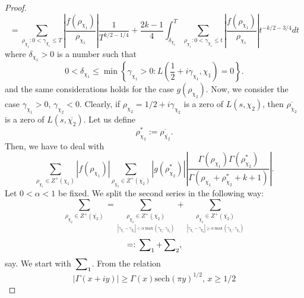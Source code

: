 \documentclass[10pt,a4paper]{amsart}
\numberwithin{equation}{section}
\numberwithin{figure}{section}
\begin{document}
\begin{proof}
\[\]
\begin{equation}
=\sum_{\rho_{\chi_{1}}:0<\gamma_{\chi_{1}}\leq T}\left|\frac{f\left(\rho_{\chi_{1}}\right)}{\rho_{\chi_{1}}}\right|\frac{1}{T^{k/2-1/4}}+\frac{2k-1}{4}\int_{\delta_{\chi_{1}}}^{T}\sum_{\rho_{\chi_{1}}:0<\gamma_{\chi_{1}}\leq t}\left|\frac{f\left(\rho_{\chi_{1}}\right)}{\rho_{\chi_{1}}}\right|t^{-k/2-3/4}dt\label{eq:PS double series}
\end{equation}
where $\delta_{\chi_{1}}>0$ is a number such that
\[
0<\delta_{\chi_{1}}\leq\min\left\{ \gamma_{\chi_{1}}>0:L\left(\frac{1}{2}+i\gamma_{\chi_{1}},\chi_{1}\right)=0\right\} .
\]
and the same considerations holds for the case $g\left(\rho_{\chi_{2}}\right)$.
Now, we consider the case $\gamma_{\chi_{1}}>0,\,\gamma_{\chi_{2}}<0.$
Clearly, if $\rho_{\chi_{2}}=1/2+i\gamma_{\chi_{2}}$ is a zero of
$L\left(s,\chi_{2}\right)$, then $\overline{\rho_{\chi_{2}}}$ is
a zero of $L\left(s,\overline{\chi_{2}}\right)$. Let us define
\[
\rho_{\chi_{2}}^{*}:=\overline{\rho_{\overline{\chi_{2}}}}.
\]
Then, we have to deal with
\[
\sum_{\rho_{\chi_{1}}\in Z^{+}\left(\chi_{1}\right)}\left|f\left(\rho_{\chi_{1}}\right)\right|\sum_{\rho_{\overline{\chi_{2}}}\in Z^{+}\left(\overline{\chi_{2}}\right)}\left|g\left(\rho_{\chi_{2}}^{*}\right)\right|\left|\frac{\Gamma\left(\rho_{\chi_{1}}\right)\Gamma\left(\rho_{\chi_{2}}^{*}\right)}{\Gamma\left(\rho_{\chi_{1}}+\rho_{\chi_{2}}^{*}+k+1\right)}\right|.
\]
Let $0<\alpha<1$ be fixed. We split the second series in the following
way:
\[
\sum_{\rho_{\chi_{2}}\in Z^{+}\left(\overline{\chi_{2}}\right)}=\sum_{\underset{{\scriptstyle \left|\gamma_{\chi_{1}}-\gamma_{\chi_{2}}\right|<\alpha\max\left(\gamma_{\chi_{1}},\gamma_{\chi_{2}}\right)}}{\rho_{\overline{\chi_{2}}}\in Z^{+}\left(\overline{\chi_{2}}\right)}}+\sum_{\underset{{\scriptstyle \left|\gamma_{\chi_{1}}-\gamma_{\chi_{2}}\right|\geq\alpha\max\left(\gamma_{\chi_{1}},\gamma_{\chi_{2}}\right)}}{\rho_{\overline{\chi_{2}}}\in Z^{+}\left(\overline{\chi_{2}}\right)}}
\]
\[
=:\sideset{}{_{1}}\sum+\sideset{}{_{2}}\sum,
\]
say. We start with $\sideset{}{_{1}}\sum$. From the relation
\[
\left|\Gamma\left(x+iy\right)\right|\geq\Gamma\left(x\right)\text{sech}\left(\pi y\right)^{1/2},\,x\geq1/2
\]


\end{proof}
\end{document}
